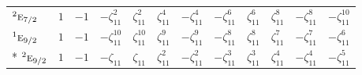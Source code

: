 \documentclass[10pt,a4paper]{article}
\numberwithin{equation}{section}
\newcommand{\irr}[1]{\text{\normalfont\scshape #1}}
\newcommand{\conjpair}[1]{{}^{#1}}
\newcommand{\rootunity}[1]{\zeta_{#1}}
\begin{document}
{\begin{longtable}{@{}lccccccccccc@{}}
$\conjpair{2}\irr{e}_{7/2}$ & $1$ & $-1$ & $-\rootunity{11}^{2}$ & $\rootunity{11}^{2}$ & $\rootunity{11}^{4}$ & $-\rootunity{11}^{4}$ & $-\rootunity{11}^{6}$ & $\rootunity{11}^{6}$ & $\rootunity{11}^{8}$ & $-\rootunity{11}^{8}$ & $-\rootunity{11}^{10}$\\
$\conjpair{1}\irr{e}_{9/2}$ & $1$ & $-1$ & $-\rootunity{11}^{10}$ & $\rootunity{11}^{10}$ & $\rootunity{11}^{9}$ & $-\rootunity{11}^{9}$ & $-\rootunity{11}^{8}$ & $\rootunity{11}^{8}$ & $\rootunity{11}^{7}$ & $-\rootunity{11}^{7}$ & $-\rootunity{11}^{6}$\\*
$\conjpair{2}\irr{e}_{9/2}$ & $1$ & $-1$ & $-\rootunity{11}$ & $\rootunity{11}$ & $\rootunity{11}^{2}$ & $-\rootunity{11}^{2}$ & $-\rootunity{11}^{3}$ & $\rootunity{11}^{3}$ & $\rootunity{11}^{4}$ & $-\rootunity{11}^{4}$ & $-\rootunity{11}^{5}$\\
\bottomrule\end{longtable}}
\end{document}
